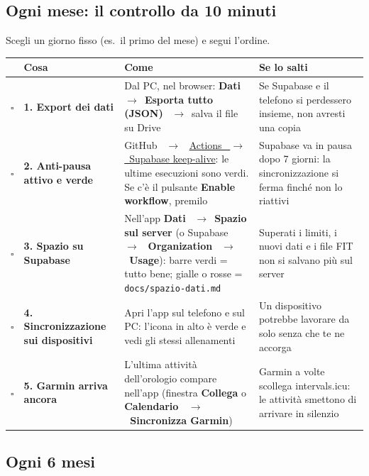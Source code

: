 \documentclass[11pt,a4paper]{article}
\newcommand{\thead}[1]{\textbf{\color{accent}#1}}
\newcommand{\ra}{\unskip\nobreak\ $\rightarrow$\ \ignorespaces}            %
\newcommand{\bt}[1]{\textbf{#1}}               %
\newcommand{\code}[1]{\texttt{#1}}             %
\newcommand{\todo}{$\square$\enspace}          %
\newcommand{\repo}{https://github.com/AleCovi04/My-Masterpiece}
\begin{document}
\subsection*{Ogni mese: il controllo da 10 minuti}

Scegli un giorno fisso (es.\ il primo del mese) e segui l'ordine.

{\small
\begin{tabularx}{\textwidth}{L{0.5cm}L{3.2cm}YL{4.0cm}}
  \toprule \thead{} & \thead{Cosa} & \thead{Come} & \thead{Se lo salti} \\ \midrule
  \todo & \bt{1. Export dei dati} & Dal PC, nel browser: \bt{Dati} \ra \bt{Esporta tutto (JSON)}
    \ra salva il file su Drive & Se Supabase e il telefono si perdessero insieme, non avresti una copia \\
  \todo & \bt{2. Anti-pausa attivo e verde} & GitHub \ra
    \href{\repo/actions/workflows/supabase-keepalive.yml}{Actions \ra Supabase keep-alive}: le ultime
    esecuzioni sono verdi. Se c'è il pulsante \bt{Enable workflow}, premilo &
    Supabase va in pausa dopo 7 giorni: la sincronizzazione si ferma finché non lo riattivi \\
  \todo & \bt{3. Spazio su Supabase} & Nell'app \bt{Dati} \ra \bt{Spazio sul server} (o Supabase \ra
    \bt{Organization} \ra \bt{Usage}): barre verdi = tutto bene; gialle o rosse =
    \code{docs/spazio-dati.md} &
    Superati i limiti, i nuovi dati e i file FIT non si salvano più sul server \\
  \todo & \bt{4. Sincronizzazione sui dispositivi} & Apri l'app sul telefono e sul
    PC: l'icona in alto è verde e vedi gli stessi allenamenti &
    Un dispositivo potrebbe lavorare da solo senza che te ne accorga \\
  \todo & \bt{5. Garmin arriva ancora} & L'ultima attività dell'orologio compare nell'app (finestra
    \bt{Collega} o \bt{Calendario \ra Sincronizza Garmin}) &
    Garmin a volte scollega intervals.icu: le attività smettono di arrivare in silenzio \\
\bottomrule
\end{tabularx}
}

\subsection*{Ogni 6 mesi}
\end{document}

